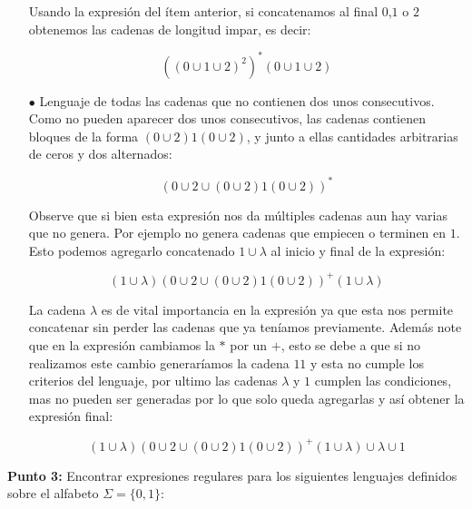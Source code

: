 \begin{itemize}
     Usando la expresión del ítem anterior, si concatenamos al final $0$,$1$ o $2$ obtenemos las cadenas de longitud impar, es decir:
    
    $$\left((0\cup1\cup2)^2\right)^*(0\cup1\cup2)$$

    \item[$\bullet$] Lenguaje de todas las cadenas que no contienen dos unos consecutivos.\\ 

    Como no pueden aparecer dos unos consecutivos, las cadenas contienen bloques de la forma $(0\cup2)1(0\cup2)$, y junto a ellas cantidades arbitrarias de ceros y dos alternados:

    $$(0\cup2\cup(0\cup2)1(0\cup2))^*$$

    Observe que si bien esta expresión nos da múltiples cadenas aun hay varias que no genera. Por ejemplo no genera cadenas que empiecen o terminen en $1$. Esto podemos agregarlo concatenado $1\cup\lambda$ al inicio y final de la expresión:

    $$(1\cup\lambda)(0\cup2\cup(0\cup2)1(0\cup2))^+(1\cup\lambda)$$

    La cadena $\lambda$ es de vital importancia en la expresión ya que esta nos permite concatenar sin perder las cadenas que ya teníamos previamente. Además note que en la expresión cambiamos la $*$ por un $+$, esto se debe a que si no realizamos este cambio generaríamos la cadena $11$ y esta no cumple los criterios del lenguaje, por ultimo las cadenas $\lambda$ y $1$ cumplen las condiciones, mas no pueden ser generadas por lo que solo queda agregarlas y así obtener la expresión final:

    $$(1\cup\lambda)(0\cup2\cup(0\cup2)1(0\cup2))^+(1\cup\lambda)\cup\lambda\cup1$$
\end{itemize}

\textbf{Punto 3: } Encontrar expresiones regulares para los siguientes lenguajes definidos sobre el alfabeto $\Sigma=\{0,1\}:$

